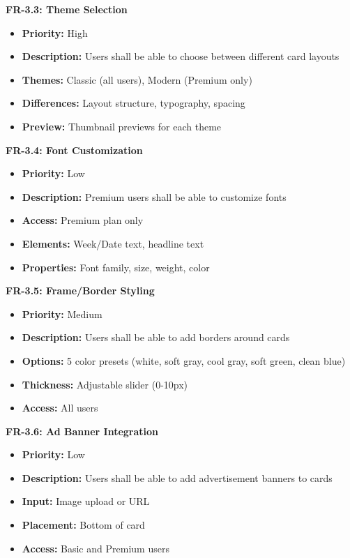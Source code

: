\documentclass[12pt,a4paper]{article}
\begin{document}
\textbf{FR-3.3: Theme Selection}
\begin{itemize}
    \item \textbf{Priority:} High
    \item \textbf{Description:} Users shall be able to choose between different card layouts
    \item \textbf{Themes:} Classic (all users), Modern (Premium only)
    \item \textbf{Differences:} Layout structure, typography, spacing
    \item \textbf{Preview:} Thumbnail previews for each theme
\end{itemize}

\textbf{FR-3.4: Font Customization}
\begin{itemize}
    \item \textbf{Priority:} Low
    \item \textbf{Description:} Premium users shall be able to customize fonts
    \item \textbf{Access:} Premium plan only
    \item \textbf{Elements:} Week/Date text, headline text
    \item \textbf{Properties:} Font family, size, weight, color
\end{itemize}

\textbf{FR-3.5: Frame/Border Styling}
\begin{itemize}
    \item \textbf{Priority:} Medium
    \item \textbf{Description:} Users shall be able to add borders around cards
    \item \textbf{Options:} 5 color presets (white, soft gray, cool gray, soft green, clean blue)
    \item \textbf{Thickness:} Adjustable slider (0-10px)
    \item \textbf{Access:} All users
\end{itemize}

\textbf{FR-3.6: Ad Banner Integration}
\begin{itemize}
    \item \textbf{Priority:} Low
    \item \textbf{Description:} Users shall be able to add advertisement banners to cards
    \item \textbf{Input:} Image upload or URL
    \item \textbf{Placement:} Bottom of card
    \item \textbf{Access:} Basic and Premium users
\end{itemize}
\end{document}
